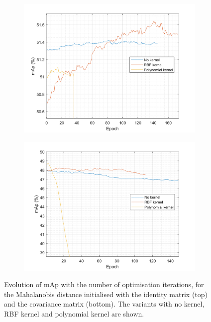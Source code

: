 \documentclass[10pt,technote]{IEEEtran}
\begin{document}
\begin{figure}
\begin{subfigure}{\linewidth}
    \centering
    \includegraphics[width=\linewidth]{Graphs/I_init_comparison.png}
    
    
\end{subfigure}
\begin{subfigure}{\linewidth}
    \centering
    \includegraphics[width=\linewidth]{Graphs/cov_init_comparison.png}
\end{subfigure}
\caption{Evolution of mAp with the number of optimisation iterations, for the Mahalanobis distance initialised with the identity matrix (top) and the covariance matrix (bottom). The variants with no kernel, RBF kernel and polynomial kernel are shown.}
\label{fig:comparison_init}
\end{figure}
\end{document}
